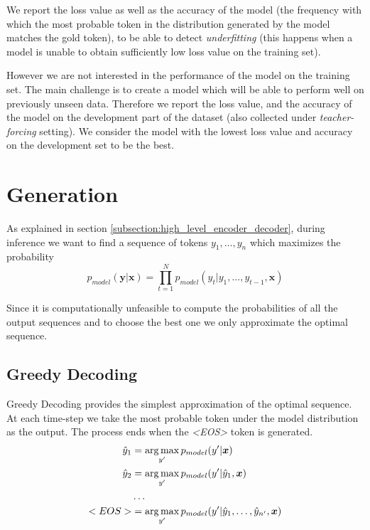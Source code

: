 We report the loss value as well as the accuracy of the model (the frequency with which the most probable token in the distribution generated by the model matches the gold token), to be able to detect \emph{underfitting} (this happens when a model is unable to obtain sufficiently low loss value on the training set).

However we are not interested in the performance of the model on the training set. The main challenge is to create a model which will be able to perform well on previously unseen data. Therefore we report the loss value, and the accuracy of the model on the development part of the dataset (also collected under \emph{teacher-forcing} setting). We consider the model with the lowest loss value and accuracy on the development set to be the best.

\section{Generation} \label{section:generation}

As explained in section \ref{subsection:high_level_encoder_decoder}, during inference we want to find a sequence of tokens $y_1,\dots,y_n$ which maximizes the probability
\begin{equation}
    p_{model}(\boldsymbol{y} | \boldsymbol{x}) = \prod_{t=1}^N{p_{model}(y_t|y_1,\dots,y_{t-1}, \boldsymbol{x})}
\end{equation}

Since it is computationally  unfeasible to compute the probabilities of all the output sequences and to choose the best one we only approximate the optimal sequence.

\subsection{Greedy Decoding}

Greedy Decoding provides the simplest approximation of the optimal sequence. At each time-step we take the most probable token under the model distribution as the output. The process ends when the \emph{\textless EOS\textgreater} token is generated.
\begin{align*}
    \hat{y}_1 &= \operatorname*{arg\,max}_{y'}{p_{model}(y' | \boldsymbol{x})} \\
    \hat{y}_2 &= \operatorname*{arg\,max}_{y'}{p_{model}(y' | \hat{y}_1, \boldsymbol{x})} \\
    &\dots \\
    <EOS> &= \operatorname*{arg\,max}_{y'}{p_{model}(y' | \hat{y}_1,\dots,\hat{y}_{n'}, \boldsymbol{x})}
\end{align*}


